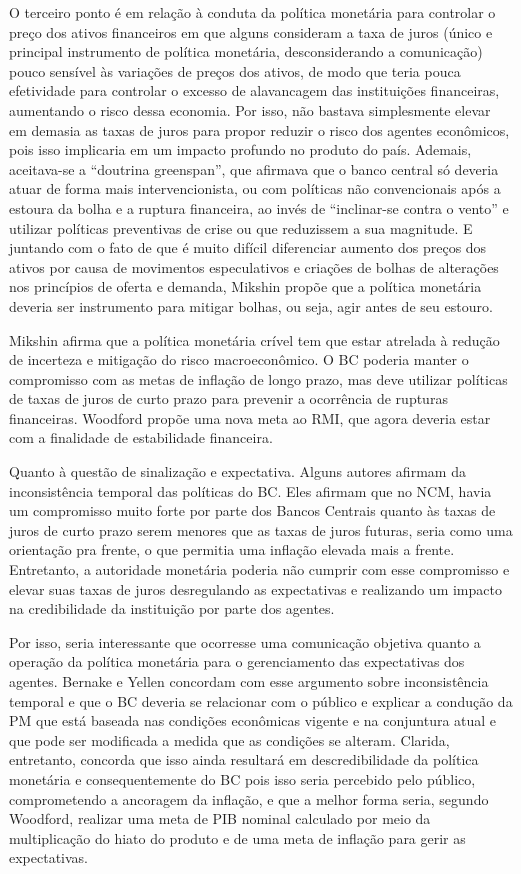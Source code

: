 \documentclass[report]{uftex}
\begin{document}
O terceiro ponto é em relação à conduta da política monetária para controlar o preço dos ativos financeiros em que alguns consideram a taxa de juros (único e principal instrumento de política monetária, desconsiderando a comunicação) pouco sensível às variações de preços dos ativos, de modo que teria pouca efetividade para controlar o excesso de alavancagem das instituições financeiras, aumentando o risco dessa economia. Por isso, não bastava simplesmente elevar em demasia as taxas de juros para propor reduzir o risco dos agentes econômicos, pois isso implicaria em um impacto profundo no produto do país. Ademais, aceitava-se a “doutrina greenspan”, que afirmava que o banco central só deveria atuar de forma mais intervencionista, ou com políticas não convencionais após a estoura da bolha e a ruptura financeira, ao invés de “inclinar-se contra o vento” e utilizar políticas preventivas de crise ou que reduzissem a sua magnitude. E juntando com o fato de que é muito difícil diferenciar aumento dos preços dos ativos por causa de movimentos especulativos e criações de bolhas de alterações nos princípios de oferta e demanda, Mikshin propõe que a política monetária deveria ser instrumento para mitigar bolhas, ou seja, agir antes de seu estouro.

Mikshin afirma que a política monetária crível tem que estar atrelada à redução de incerteza e mitigação do risco macroeconômico. O BC poderia manter o compromisso com as metas de inflação de longo prazo, mas deve utilizar políticas de taxas de juros de curto prazo para prevenir a ocorrência de rupturas financeiras. Woodford propõe uma nova meta ao RMI, que agora deveria estar com a finalidade de estabilidade financeira. 

Quanto à questão de sinalização e expectativa. Alguns autores afirmam da inconsistência temporal das políticas do BC. Eles afirmam que no NCM, havia um compromisso muito forte por parte dos Bancos Centrais quanto às taxas de juros de curto prazo serem menores que as taxas de juros futuras, seria como uma orientação pra frente, o que permitia uma inflação elevada mais a frente. Entretanto, a autoridade monetária poderia não cumprir com esse compromisso e elevar suas taxas de juros desregulando as expectativas e realizando um impacto na credibilidade da instituição por parte dos agentes.

Por isso, seria interessante que ocorresse uma comunicação objetiva quanto a operação da política monetária para o gerenciamento das expectativas dos agentes. Bernake e Yellen concordam com esse argumento sobre inconsistência temporal e que o BC deveria se relacionar com o público e explicar a condução da PM que está baseada nas condições econômicas vigente e na conjuntura atual e que pode ser modificada a medida que as condições se alteram. Clarida, entretanto, concorda que isso ainda resultará em descredibilidade da política monetária e consequentemente do BC pois isso seria percebido pelo público, comprometendo a ancoragem da inflação, e que a melhor forma seria, segundo Woodford, realizar uma meta de PIB nominal calculado por meio da multiplicação do hiato do produto e de uma meta de inflação para gerir as expectativas. 
\end{document}
